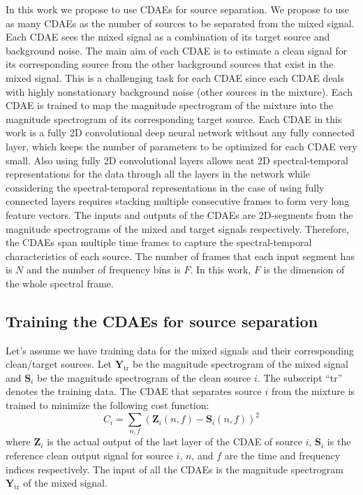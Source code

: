 \documentclass{article}
\begin{document}
In this work we propose to use CDAEs for source separation. We propose to use as many CDAEs as the number of sources to be separated from the mixed signal. Each CDAE sees the mixed signal as a combination of its target source and background noise. The main aim of each CDAE is to estimate a clean signal for its corresponding source from the other background sources that exist in the mixed signal. This is a challenging task for each CDAE since each CDAE deals with highly nonstationary background noise (other sources in the mixture). Each CDAE is trained to map the magnitude spectrogram of the mixture into the magnitude spectrogram of its corresponding target source. Each CDAE in this work is a fully 2D convolutional deep neural network without any fully connected layer, which keeps the number of parameters to be optimized for each CDAE very small. Also using fully 2D convolutional layers allows neat 2D spectral-temporal representations for the data through all the layers in the network while considering the spectral-temporal representations in the case of using fully connected layers requires stacking multiple consecutive frames to form very long feature vectors. The inputs and outputs of the CDAEs are 2D-segments from the magnitude spectrograms of the mixed and target signals respectively. Therefore, the CDAEs span multiple time frames to capture the spectral-temporal characteristics of each source. The number of frames that each input segment has is $N$ and the number of frequency bins is $F$. In this work, $F$ is the dimension of the whole spectral frame.  
%
%
\subsection{Training the CDAEs for source separation}
\label{sec:train}
Let's assume we have training data for the mixed signals and their corresponding clean/target sources. Let $\mathbf{Y}_{\mbox{tr}}$ be the magnitude spectrogram of the mixed signal and $\mathbf{S}_i$ be the magnitude spectrogram of the clean source $i$. The subscript ``tr'' denotes the training data. The CDAE that separates source $i$ from the mixture is trained to minimize the following cost function:
\begin{equation}
\label{cost_mask}
C_i =\sum_{n,f}\left( \mathbf{Z}_i\left(n,f\right) - \mathbf{S}_i\left(n,f\right) \right)^2
\end{equation}
where $\mathbf{Z}_i$ is the actual output of the last layer of the CDAE of source $i$, $\mathbf{S}_i$ is the reference clean output signal for source $i$, $n$, and $f$ are the time and frequency indices respectively. The input of all the CDAEs is the magnitude spectrogram $\mathbf{Y}_{\mbox{tr}}$ of the mixed signal. 
\end{document}
